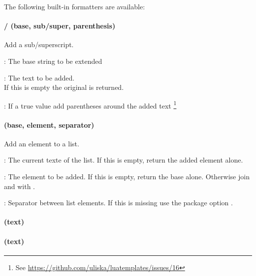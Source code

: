 \documentclass{scrartcl}
\begin{document}
\medskip

\noindent
The following built-in formatters are available:

\paragraph{ /  (base, sub/super, parenthesis)}

Add a sub/superscript.

\begin{itemize*}
\item {}: The base string to be extended
\item {}: The text to be added.\\If this is empty the original
 is returned.
\item {}: If a true value add parentheses around the added text%
\footnote{See \url{https://github.com/uliska/luatemplates/issues/16}}
\end{itemize*}


\paragraph{ (base, element, separator)}

Add an element to a list.

\begin{itemize*}
\item {}: The current texte of the list. If this is empty, return
the added element alone.
\item {}: The element to be added. If this is empty, return the base
alone.  Otherwise join  and  with .
\item {}: Separator between list elements.  If this is missing
use the package option .
\end{itemize*}


\paragraph{ (text)}

\paragraph{ (text)}
\end{document}
